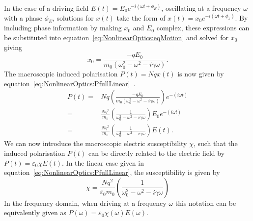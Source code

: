 In the case of a driving field $E(t) = E_0 e^{-i(\omega t + \phi_E)}$, oscillating at a frequency $\omega$ with a phase $\phi_E$, solutions for $x(t)$ take the form of $x(t) = x_0 e^{-i(\omega t + \phi_x)}$. By including phase information by making $x_0$ and $E_0$ complex, these expressions can be substituted into equation~\ref{eq:NonlinearOptics:eqMotion} and solved for $x_0$ giving
\begin{equation}\label{eq:NonlinearOptics:x0}
	x_0 = \frac{-q E_0}{m_0 (\omega_{0}^2 -\omega^2 -i \gamma \omega)}.
\end{equation}
The macroscopic induced polarisation $P(t) = N q x(t)$ is now given by equation~\ref{eq:NonlinearOptics:PfullLinear}~\cite[\S 2.2.1]{fox2002optical}.
\begin{equation}\label{eq:NonlinearOptics:PfullLinear}
	\begin{split}
		P(t) = & N q \left( \frac{-q E_0}{m_0 (\omega_{0}^2 -\omega^2 -i \gamma \omega)} \right) e^{-(i\omega t)} \\
		= & \frac{N q^2}{m_0} \left( \frac{1}{\omega_{0}^2 -\omega^2 -i \gamma \omega} \right) E_0 e^{-(i\omega t)} \\
		= & \frac{N q^2}{m_0} \left( \frac{1}{\omega_{0}^2 -\omega^2 -i \gamma \omega} \right) E(t).
	\end{split}
\end{equation}
We can now introduce the macroscopic electric susceptibility $\chi$, such that the induced polarisation $P(t)$ can be directly related to the electric field by $P(t) = \varepsilon_0 \chi E(t)$. In the linear case given in equation~\ref{eq:NonlinearOptics:PfullLinear}, the susceptibility is given by
\begin{equation}\label{eq:NonlinearOptics:chiFullLinear}
		\chi = \frac{N q^2}{\varepsilon_0 m_0} \left( \frac{1}{\omega_{0}^2 -\omega^2 -i \gamma \omega} \right)
\end{equation}
In the frequency domain, when driving at a frequency $\omega$ this notation can be equivalently given as $P(\omega) = \varepsilon_0 \chi(\omega) E(\omega)$.

